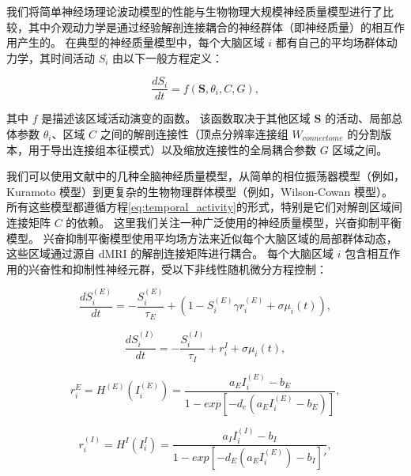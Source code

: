 \documentclass[lang=cn,a4paper,newtx]{elegantpaper}
\begin{document}
我们将简单神经场理论波动模型的性能与生物物理大规模神经质量模型进行了比较，其中介观动力学是通过经验解剖连接耦合的神经群体（即神经质量）的相互作用产生的。
在典型的神经质量模型中，每个大脑区域 $ i $ 都有自己的平均场群体动力学，其时间活动 $ S_i $ 由以下一般方程定义：

\begin{equation}\label{eq:temporal_activity}
	\frac{dS_i}{dt} = f(\boldsymbol{S}, \theta_i, C, G), 
\end{equation}

其中 $ f $ 是描述该区域活动演变的函数。
该函数取决于其他区域 $ \boldsymbol{S} $ 的活动、局部总体参数 $ \theta_i $、区域 $ C $ 之间的解剖连接性（顶点分辨率连接组 $ W_{connectome} $ 的分割版本，用于导出连接组本征模式）以及缩放连接性的全局耦合参数 $ G $ 区域之间。


我们可以使用文献中的几种全脑神经质量模型\cite{sanz2013virtual}，从简单的相位振荡器模型（例如，Kuramoto 模型\cite{breakspear2010generative}）到更复杂的生物物理群体模型（例如，Wilson-Cowan 模型\cite{wilson1972excitatory}）。
所有这些模型都遵循方程\ref{eq:temporal_activity}的形式，特别是它们对解剖区域间连接矩阵 $ C $ 的依赖。
这里我们关注一种广泛使用的神经质量模型，兴奋抑制平衡模型\cite{deco2014local,deco2021dynamical,demirtacs2019hierarchical,aquino2022intersection}。
兴奋抑制平衡模型使用平均场方法来近似每个大脑区域的局部群体动态，这些区域通过源自 dMRI 的解剖连接矩阵进行耦合。
每个大脑区域 $ i $ 包含相互作用的兴奋性和抑制性神经元群，受以下非线性随机微分方程控制：

\begin{equation}\label{eq:synaptic_gating_E}
	\frac{dS_i^{(E)}}{dt} = - \frac{S_i^{(E)}}{\tau_E} + (1-S_i^{(E)} \gamma r_i^(E) + \sigma \mu_i(t)),
\end{equation}

\begin{equation}\label{eq:synaptic_gating_I}
	\frac{dS_i^{(I)}}{dt} = - \frac{S_i^{(I)}}{\tau_I} + r_i^{I} + \sigma \mu_i(t),
\end{equation}

\begin{equation}\label{eq:firing_rate_E}
	r_i^{E} = H^{(E)} (I_i^{(E)}) = \frac{a_E I_i^{(E)} - b_E}{1 - exp[-d_e (a_E I_i^{(E)} - b_E)]},
\end{equation}

\begin{equation}\label{eq:firing_rate_I}
	r_i^{(I)} = H^{I} (I_i^{I}) = \frac{a_I I_i^{(I)} - b_I}{1 - exp[-d_E (a_E I_i^{(E)}) - b_I]'},
\end{equation}
\end{document}
